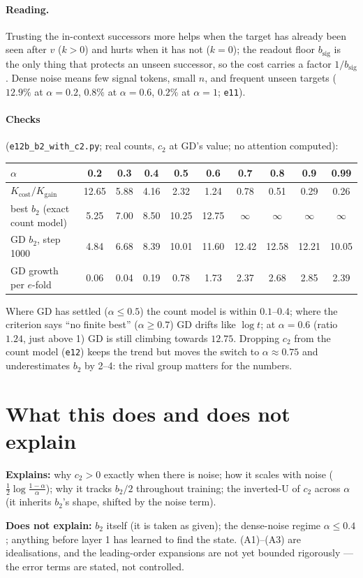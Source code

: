 \documentclass[11pt]{article}
\theoremstyle{remark}\newtheorem{remark}{Remark}
\newcommand{\1}{\mathbf{1}}
\begin{document}
\paragraph{Reading.} Trusting the in-context successors more helps when the target has already
been seen after $v$ ($k>0$) and hurts when it has not ($k=0$); the readout floor $b_{\mathrm{sig}}$ is
the only thing that protects an unseen successor, so the cost carries a factor $1/b_{\mathrm{sig}}$.
Dense noise means few signal tokens, small $n$, and frequent unseen targets ($12.9\%$ at
$\alpha=0.2$, $0.8\%$ at $\alpha=0.6$, $0.2\%$ at $\alpha=1$; \texttt{e11}).

\paragraph{Checks} (\texttt{e12b\_b2\_with\_c2.py}; real counts, $c_2$ at GD's value; no attention computed):
\begin{center}\begin{tabular}{lccccccccc}\toprule
$\alpha$ & 0.2 & 0.3 & 0.4 & 0.5 & 0.6 & 0.7 & 0.8 & 0.9 & 0.99\\\midrule
$K_{\mathrm{cost}}/K_{\mathrm{gain}}$ & 12.65 & 5.88 & 4.16 & 2.32 & 1.24 & 0.78 & 0.51 & 0.29 & 0.26\\
best $b_2$ (exact count model) & 5.25 & 7.00 & 8.50 & 10.25 & 12.75 & $\infty$ & $\infty$ & $\infty$ & $\infty$\\
GD $b_2$, step 1000 & 4.84 & 6.68 & 8.39 & 10.01 & 11.60 & 12.42 & 12.58 & 12.21 & 10.05\\
GD growth per $e$-fold & 0.06 & 0.04 & 0.19 & 0.78 & 1.73 & 2.37 & 2.68 & 2.85 & 2.39\\\bottomrule
\end{tabular}\end{center}
Where GD has settled ($\alpha\le0.5$) the count model is within $0.1$--$0.4$; where the criterion
says ``no finite best'' ($\alpha\ge0.7$) GD drifts like $\log t$; at $\alpha=0.6$ (ratio $1.24$, just
above 1) GD is still climbing towards $12.75$. Dropping $c_2$ from the count model (\texttt{e12})
keeps the trend but moves the switch to $\alpha\approx0.75$ and underestimates $b_2$ by 2--4: the
rival group matters for the numbers.

\section{What this does and does not explain}
\textbf{Explains:} why $c_2>0$ exactly when there is noise; how it scales with noise
($\tfrac12\log\frac{1-\alpha}{\alpha}$); why it tracks $b_2/2$ throughout training; the inverted-U
of $c_2$ across $\alpha$ (it inherits $b_2$'s shape, shifted by the noise term).

\textbf{Does not explain:} $b_2$ itself (it is taken as given); the dense-noise regime
$\alpha\le0.4$; anything before layer 1 has learned to find the state. (A1)--(A3) are idealisations,
and the leading-order expansions are not yet bounded rigorously --- the error terms are stated, not
controlled.
\end{document}
